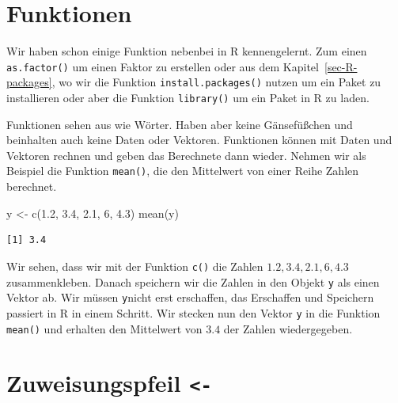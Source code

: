 \documentclass[
  letterpaper,
]{scrbook}
\newenvironment{Shaded}{\begin{snugshade}}{\end{snugshade}}
\newcommand{\DecValTok}[1]{\textcolor[rgb]{0.68,0.00,0.00}{#1}}
\newcommand{\FloatTok}[1]{\textcolor[rgb]{0.68,0.00,0.00}{#1}}
\newcommand{\FunctionTok}[1]{\textcolor[rgb]{0.28,0.35,0.67}{#1}}
\newcommand{\NormalTok}[1]{\textcolor[rgb]{0.00,0.23,0.31}{#1}}
\newcommand{\OtherTok}[1]{\textcolor[rgb]{0.00,0.23,0.31}{#1}}
\begin{document}
\hypertarget{sec-R-function}{%
\section{Funktionen}\label{sec-R-function}}

Wir haben schon einige Funktion nebenbei in R kennengelernt. Zum einen
\texttt{as.factor()} um einen Faktor zu erstellen oder aus dem
Kapitel~\ref{sec-R-packages}, wo wir die Funktion
\texttt{install.packages()} nutzen um ein Paket zu installieren oder
aber die Funktion \texttt{library()} um ein Paket in R zu laden.

Funktionen sehen aus wie Wörter. Haben aber keine Gänsefüßchen und
beinhalten auch keine Daten oder Vektoren. Funktionen können mit Daten
und Vektoren rechnen und geben das Berechnete dann wieder. Nehmen wir
als Beispiel die Funktion \texttt{mean()}, die den Mittelwert von einer
Reihe Zahlen berechnet.

\begin{Shaded}
\begin{Highlighting}[]
\NormalTok{y }\OtherTok{\textless{}{-}} \FunctionTok{c}\NormalTok{(}\FloatTok{1.2}\NormalTok{, }\FloatTok{3.4}\NormalTok{, }\FloatTok{2.1}\NormalTok{, }\DecValTok{6}\NormalTok{, }\FloatTok{4.3}\NormalTok{)}
\FunctionTok{mean}\NormalTok{(y)}
\end{Highlighting}
\end{Shaded}

\begin{verbatim}
[1] 3.4
\end{verbatim}

Wir sehen, dass wir mit der Funktion \texttt{c()} die Zahlen
\(1.2, 3.4, 2.1, 6, 4.3\) zusammenkleben. Danach speichern wir die
Zahlen in den Objekt \texttt{y} als einen Vektor ab. Wir müssen
\texttt{y}nicht erst erschaffen, das Erschaffen und Speichern passiert
in R in einem Schritt. Wir stecken nun den Vektor \texttt{y} in die
Funktion \texttt{mean()} und erhalten den Mittelwert von \(3.4\) der
Zahlen wiedergegeben.

{}

\hypertarget{sec-R-pfeil}{%
\section{\texorpdfstring{Zuweisungspfeil
\texttt{\textless{}-}}{Zuweisungspfeil \textless-}}\label{sec-R-pfeil}}
\end{document}
